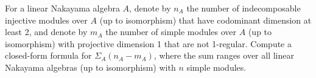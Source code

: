 For a linear Nakayama algebra $A$, denote by $n_A$ the number of indecomposable injective modules over $A$ (up to isomorphism) that have codominant dimension at least 2, and denote by $m_A$ the number of simple modules over $A$ (up to isomorphism) with projective dimension 1 that are not 1-regular. Compute a closed-form formula for $\Sigma_A (n_A - m_A)$, where the sum ranges over all linear Nakayama algebras (up to isomorphism) with $n$ simple modules.
